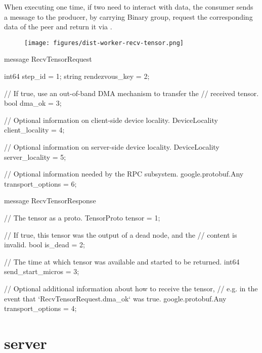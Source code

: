 \begin{content}
When executing  one time, if two  need to interact with data, the consumer sends a  message to the producer, by carrying  Binary group, request the corresponding  data of the peer  and return it via .

\begin{figure}[H]
\centering
\texttt{[image: figures/dist-worker-recv-tensor.png]}
\caption{}
 \label{fig:dist-worker-recv-tensor}
\end{figure}

\begin{leftbar}
\begin{c++}
message RecvTensorRequest {
  int64 step_id = 1;
  string rendezvous_key = 2;

  // If true, use an out-of-band DMA mechanism to transfer the
  // received tensor.
  bool dma_ok = 3;

  // Optional information on client-side device locality.
  DeviceLocality client_locality = 4;

  // Optional information on server-side device locality.
  DeviceLocality server_locality = 5;

  // Optional information needed by the RPC subsystem.
  google.protobuf.Any transport_options = 6;
}

message RecvTensorResponse {
  // The tensor as a proto.
  TensorProto tensor = 1;

  // If true, this tensor was the output of a dead node, and the
  // content is invalid.
  bool is_dead = 2;

  // The time at which tensor was available and started to be returned.
  int64 send_start_micros = 3;

  // Optional additional information about how to receive the tensor,
  // e.g. in the event that `RecvTensorRequest.dma\_ok` was true.
  google.protobuf.Any transport_options = 4;
}
\end{c++}
\end{leftbar}

\end{content}

\section{server}

